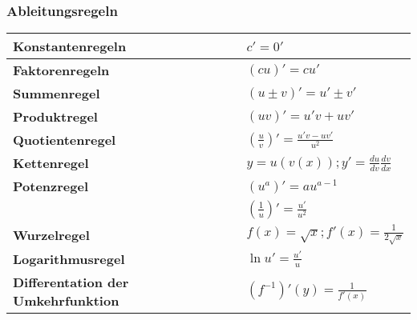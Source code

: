 \subsubsection{Ableitungsregeln}
\renewcommand{\arraystretch}{1.5}
\begin{tabular}{|l|l|}
	\hline \textbf{Konstantenregeln}& $c'=0'$\\
	\hline \textbf{Faktorenregeln}& $(cu)'=c u'$\\
	\hline \textbf{Summenregel}& $(u\pm v)'= u' \pm v'$\\
	\hline \textbf{Produktregel}& $(uv)'=u'v + uv'$\\
	\hline \textbf{Quotientenregel}& $(\frac{u}{v})'= \frac{u'v-uv'}{u^{2}}$\\
	\hline \textbf{Kettenregel}& $y=u(v(x)) ; y'=\frac{du}{dv} \frac{dv}{dx}$\\
	\hline \textbf{Potenzregel} & $(u^{a})'=au^{a-1}$\\
	& $(\frac{1}{u})'= \frac{u'}{u^2}$\\
	\hline	\textbf{Wurzelregel} & $f(x)=\sqrt{x} ; f'(x)=\frac{1}{2\sqrt{x}}$\\
	\hline	\textbf{Logarithmusregel} & $\ln{u}'=\frac{u'}{u}$\\ 
	\hline	\textbf{Differentation der Umkehrfunktion} & $(f^{-1})'(y)=\frac{1}{f'(x)} $\\
	\hline 
\end{tabular}
